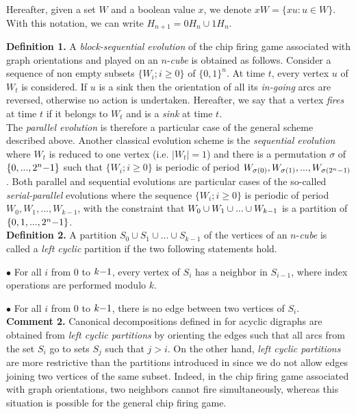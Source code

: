 \documentclass{article}
\begin{document}
Hereafter, given a set $W$ and a boolean value $x$, we denote $xW=\{ xu:u\in
W\}$. With this notation, we can write $H_{n+1}=0H_{n}\cup 1H_n$.

{\bf Definition 1.} A {\em block-sequential evolution} of the chip firing game
associated with graph orientations and played on an $n$-{\em cube} is
obtained as follows. Consider a sequence of non empty subsets $\{ W_i;i\geq
0\}$ of $\{ 0,1\} ^n$. At time $t$, every vertex $u$ of $W_t$ is
considered. If $u$ is a sink then the orientation of all its {\em in-going}
arcs are reversed, otherwise no action is undertaken. Hereafter, we say that a vertex {\em fires} at time $t$
if it belongs to $W_t$ and is a {\em sink} at time $t$.\vspace{2mm} \\

The {\em parallel evolution} is therefore a particular case of the general
scheme described above. Another classical evolution scheme is the {\em
  sequential evolution} where $W_t$ is reduced to one vertex (i.e. $|W_t|=1$)
and there is a permutation $\sigma$ of $\{ 0,...,2^n{\rm -}1 \}$ such that $\{
W_i;i\geq 0\}$ is periodic of period $W_{\sigma(0)}, W_{\sigma(1)},...,
W_{\sigma(2^n{\rm-}1)}$. Both parallel and sequential evolutions are particular cases of the
so-called {\em serial-parallel} evolutions where the sequence $\{
W_i;i\geq 0 \}$ is periodic of period $W_0, W_1,...,W_{k-1}$, with the constraint that
  $W_0\cup W_1\cup ... \cup W_{k{\rm -}1}$ is a partition of $\{ 0,1,...,2^n{\rm
    -}1 \}$.\vspace{2mm}\\

{\bf Definition 2.} A partition $S_0\cup S_1\cup ...\cup S_{k-1}$ of the
vertices of an $n$-{\em cube} is called a {\em left cyclic} partition if the
two following statements hold.

$\bullet$ For all $i$ from $0$ to $k{\rm -}1$, every vertex of $S_i$ has a
neighbor in $S_{i-1}$, where index operations are performed modulo $k$.

$\bullet$ For all $i$ from $0$ to $k{\rm -}1$, there is no edge between two
vertices of $S_i$.\vspace{2mm}\\
{\bf Comment 2.} Canonical decompositions defined in \cite{GOL:00} for
acyclic digraphs are obtained from {\em left cyclic partitions} by orienting
the edges such that all arcs from the set $S_i$ go to sets
$S_j$ such that $j>i$. On the other hand, {\em left cyclic partitions} are more
restrictive than the partitions introduced in \cite{PRI:94} since we do not
allow edges joining two vertices of the same subset. Indeed, in the chip
firing game associated with graph orientations, two neighbors cannot fire
simultaneously, whereas this situation is possible for the general chip firing
game. \\
\end{document}
